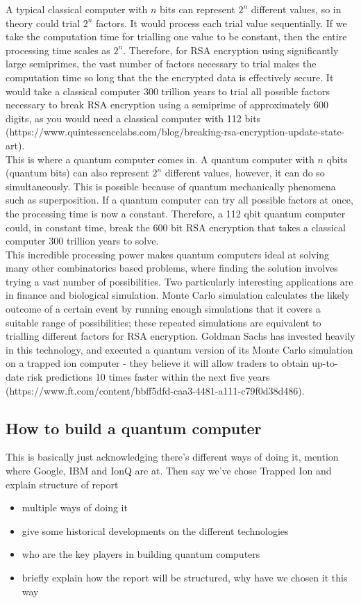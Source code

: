 A typical classical computer with $n$ bits can represent $2^n$ different values, so in theory could trial $2^n$ factors. It would process each trial value sequentially. If we take the computation time for trialling one value to be constant, then the entire processing time scales as $2^n$. Therefore, for RSA encryption using significantly large semiprimes, the vast number of factors necessary to trial makes the computation time so long that the the encrypted data is effectively secure. It would take a classical computer 300 trillion years to trial all possible factors necessary to break RSA encryption using a semiprime of approximately 600 digits, as you would need a classical computer with 112 bits (https://www.quintessencelabs.com/blog/breaking-rsa-encryption-update-state-art).\\

This is where a quantum computer comes in. A quantum computer with $n$ qbits (quantum bits) can also represent $2^n$ different values, however, it can do so simultaneously. This is possible because of quantum mechanically phenomena such as superposition. If a quantum computer can try all possible factors at once, the processing time is now a constant. Therefore, a 112 qbit quantum computer could, in constant time, break the 600 bit RSA encryption that takes a classical computer 300 trillion years to solve.\\

This incredible processing power makes quantum computers ideal at solving many other combinatorics based problems, where finding the solution involves trying a vast number of possibilities. Two particularly interesting applications are in finance and biological simulation. Monte Carlo simulation calculates the likely outcome of a certain event by running enough simulations that it covers a suitable range of possibilities; these repeated simulations are equivalent to trialling different factors for RSA encryption. Goldman Sachs has invested heavily in this technology, and executed a quantum version of its Monte Carlo simulation on a trapped ion computer - they believe it will allow traders to obtain up-to-date risk predictions 10 times faster within the next five years (https://www.ft.com/content/bbff5dfd-caa3-4481-a111-c79f0d38d486).

\subsection{How to build a quantum computer}
This is basically just acknowledging there's different ways of doing it, mention where Google, IBM and IonQ are at. Then say we've chose Trapped Ion and explain structure of report 
\begin{itemize}
    \item multiple ways of doing it
    \item give some historical developments on the different technologies
    \item who are the key players in building quantum computers
    \item briefly explain how the report will be structured, why have we chosen it this way
\end{itemize}

